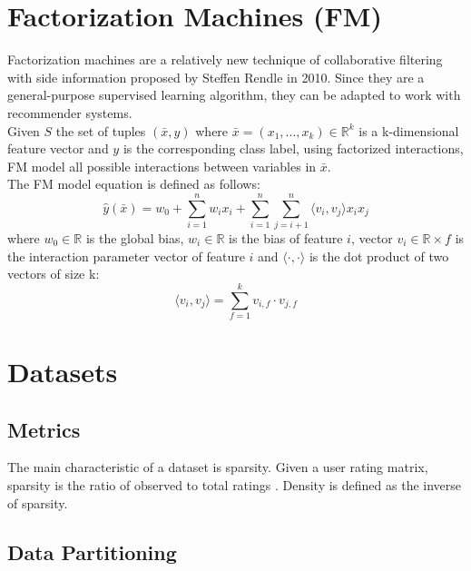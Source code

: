 \section{Factorization Machines (FM)}
\label{sc:factorization-machines}

Factorization machines \cite{10.1109/ICDM.2010.127} are a relatively new technique of collaborative filtering with side information proposed by Steffen Rendle in 2010. Since they are a general-purpose supervised learning algorithm, they can be adapted to work with recommender systems.\\
Given $S$ the set of tuples $(\bar{x}, y)$ where $\bar{x} = (x_1, ..., x_k) \in \mathbb{R}^k$ is a k-dimensional feature vector and $y$ is the corresponding class label, using factorized interactions, FM model all possible interactions between variables in $\bar{x}$.\\
The FM model equation is defined as follows:
\begin{equation*}
\hat{y}(\bar{x}) = w_0 + \sum_{i = 1}^{n} w_i x_i + \sum_{i = 1}^{n} \sum_{j = i + 1}^{n} \langle v_i, v_j \rangle x_i x_j
\end{equation*}
where $w_0 \in \mathbb{R}$ is the global bias, $w_i \in \mathbb{R}$ is the bias of feature $i$, vector $v_i \in \mathbb{R} \times f$ is the interaction parameter vector of feature $i$ and $\langle \cdot, \cdot \rangle$ is the dot product of two vectors of size k:
\begin{equation*}
\langle v_i, v_j \rangle = \sum_{f = 1}^{k} v_{i,f} \cdot v_{j,f}
\end{equation*}



\section{Datasets}


\subsection{Metrics}

The main characteristic of a dataset is sparsity. Given a user rating matrix, sparsity is the ratio of observed to total ratings \cite{sparsity}. Density is defined as the inverse of sparsity.


\subsection{Data Partitioning}


